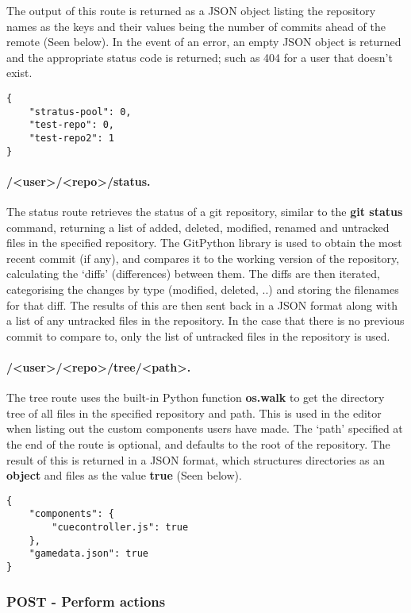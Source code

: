 	The output of this route is returned as a JSON object listing the repository names as the keys and their values being the number of commits ahead of the remote (Seen below). In the event of an error, an empty JSON object is returned and the appropriate status code is returned; such as 404 for a user that doesn't exist.

	\begin{lstlisting}
{
	"stratus-pool": 0,
	"test-repo": 0,
	"test-repo2": 1
}\end{lstlisting}

	\paragraph{/<user>/<repo>/status.}
	The status route retrieves the status of a git repository, similar to the \textbf{git status} command, returning a list of added, deleted, modified, renamed and untracked files in the specified repository. The GitPython library is used to obtain the most recent commit (if any), and compares it to the working version of the repository, calculating the `diffs' (differences) between them. The diffs are then iterated, categorising the changes by type (modified, deleted, ..) and storing the filenames for that diff. The results of this are then sent back in a JSON format along with a list of any untracked files in the repository. In the case that there is no previous commit to compare to, only the list of untracked files in the repository is used.

	\paragraph{/<user>/<repo>/tree/<path>.}
	The tree route uses the built-in Python function \textbf{os.walk} to get the directory tree of all files in the specified repository and path. This is used in the editor when listing out the custom components users have made. The `path' specified at the end of the route is optional, and defaults to the root of the repository. The result of this is returned in a JSON format, which structures directories as an \textbf{object} and files as the value \textbf{true} (Seen below).

	\begin{lstlisting}
{
	"components": {
		"cuecontroller.js": true
	},
	"gamedata.json": true
}\end{lstlisting}
	
	\subsubsection{POST - Perform actions}

